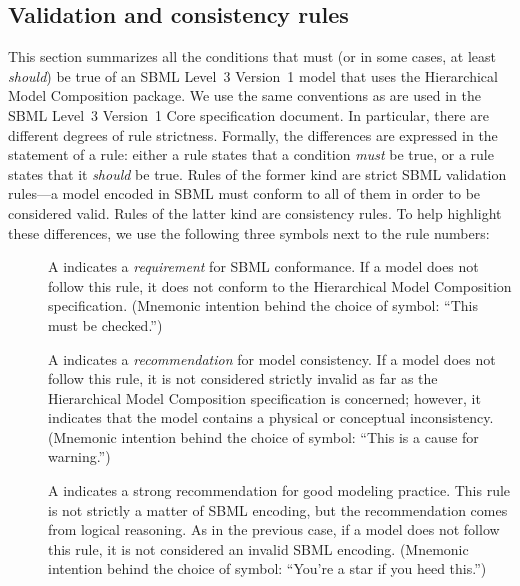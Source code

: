 \subsection{Validation and consistency rules}
\label{validation-rules}

This section summarizes all the conditions that must (or in some cases,
at least \emph{should}) be true of an SBML Level~3 Version~1 model that
uses the Hierarchical Model Composition package.  We use the same
conventions as are used in the SBML Level~3 Version~1 Core specification
document.  In particular, there are different degrees of rule
strictness.  Formally, the differences are expressed in the statement of
a rule: either a rule states that a condition \emph{must} be true, or a
rule states that it \emph{should} be true.  Rules of the former kind are
strict SBML validation rules---a model encoded in SBML must conform to
all of them in order to be considered valid.  Rules of the latter kind
are consistency rules.  To help highlight these differences, we use the
following three symbols next to the rule numbers:

\begin{description}

\item[\hspace*{6.5pt}\vSymbol\vsp] A \vSymbolName indicates a
  \emph{requirement} for SBML conformance. If a model does not follow
  this rule, it does not conform to the Hierarchical Model Composition
  specification.  (Mnemonic intention behind the choice of symbol:
  ``This must be checked.'')

\item[\hspace*{6.5pt}\cSymbol\csp] A \cSymbolName indicates a
  \emph{recommendation} for model consistency.  If a model does not
  follow this rule, it is not considered strictly invalid as far as the
  Hierarchical Model Composition specification is concerned; however, it
  indicates that the model contains a physical or conceptual
  inconsistency.  (Mnemonic intention behind the choice of symbol:
  ``This is a cause for warning.'')

\item[\hspace*{6.5pt}\mSymbol\msp] A \mSymbolName indicates a strong
  recommendation for good modeling practice.  This rule is not strictly
  a matter of SBML encoding, but the recommendation comes from logical
  reasoning.  As in the previous case, if a model does not follow this
  rule, it is not considered an invalid SBML encoding.  (Mnemonic
  intention behind the choice of symbol: ``You're a star if you heed
  this.'')

\end{description}

